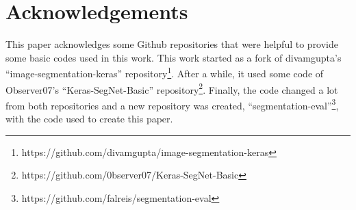 \documentclass[10pt,twocolumn,letterpaper]{article}
\begin{document}
\section{Acknowledgements} \label{sec:acknowledgements}

This paper acknowledges some Github repositories that were helpful to provide some basic codes used in this work. This work started as a fork of divamgupta's ``image-segmentation-keras'' repository\footnote{https://github.com/divamgupta/image-segmentation-keras}. After a while, it used some code of Observer07's ``Keras-SegNet-Basic'' repository\footnote{https://github.com/0bserver07/Keras-SegNet-Basic}. Finally, the code changed a lot from both repositories and a new repository was created, ``segmentation-eval''\footnote{https://github.com/falreis/segmentation-eval}, with the code used to create this paper.

{\small


}
\end{document}
